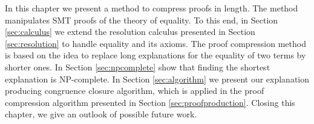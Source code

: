 
In this chapter we present a method to compress proofs in length.
The method manipulates SMT proofs of the theory of equality.
To this end, in Section \ref{sec:calculus} we extend the resolution calculus presented in Section \ref{sec:resolution} to handle equality and its axioms.
The proof compression method is based on the idea to replace long explanations for the equality of two terms by shorter ones.
In Section \ref{sec:npcomplete} show that finding the shortest explanation is NP-complete.
In Section \ref{sec:algorithm} we present our explanation producing congruence closure algorithm, which is applied in the proof compression algorithm presented in Section \ref{sec:proofproduction}.
Closing this chapter, we give an outlook of possible future work.













